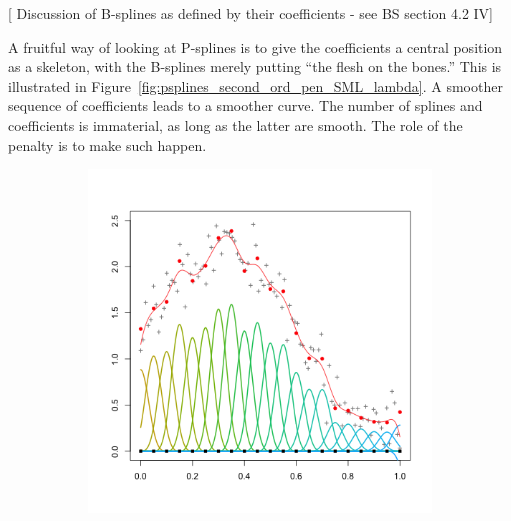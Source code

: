 \documentclass[12pt]{article}
\newcommand*\needsparaphrased{\color{red}}
\begin{document}
{\needsparaphrased 
\large [ Discussion of B-splines as defined by their coefficients - see BS section 4.2 IV] 
}

{\needsparaphrased A fruitful way of looking at P-splines is to give the coefficients a central position as a skeleton, with the B-splines merely putting ``the flesh on the bones.'' This is illustrated
in Figure~\ref{fig:psplines_second_ord_pen_SML_lambda}. A smoother sequence of coefficients leads to a smoother curve. The number of splines and coefficients is immaterial, as long as the latter are smooth. The role of the penalty is to make such happen. }

\begin{figure}[H]
\begin{subfigure}{.5\textwidth}
  \centering
   \graphicspath{{img/}}
  \includegraphics[scale=0.5]{pspline_pord2_xsmall_lambda.png}
  \label{fig:pspline_small_lambda}
\end{subfigure}
\begin{subfigure}{.5\textwidth}
  \centering
   \graphicspath{{img/}}

\end{subfigure}
\end{figure}
\end{document}
